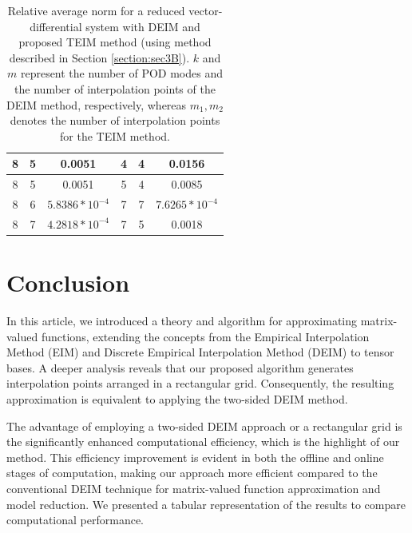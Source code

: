 \documentclass{article}
\begin{document}
\begin{table}
\begin{tabular}{|c|c|c|c|c|c|}
8 & 5          & 0.0051                                                                                       & 4           & 4           & 0.0156                                                                                        \\ \hline
8 & 5          & 0.0051                                                                                       & 5           & 4           & 0.0085                                                                                        \\ \hline
8 & 6          & $5.8386*10^{-4}$                                                                & 7           & 7           & $7.6265*10^{-4}$                                                                 \\ \hline
8 & 7          & $4.2818*10^{-4}$                                                                & 7           & 5           & 0.0018                                                                                        \\ \hline
\end{tabular}
\caption{Relative average norm for a reduced vector-differential system with DEIM and proposed TEIM method (using method described in Section \ref{section:sec3B}). $k$ and $m$ represent the number of POD modes and the number of interpolation points of the DEIM method, respectively, whereas $m_1,m_2$ denotes the number of interpolation points for the TEIM method.}
\label{tab:table5}
\end{table}



\section{Conclusion}
\label{section:sec5}
In this article, we introduced a theory and algorithm for approximating matrix-valued functions, extending the concepts from the Empirical Interpolation Method (EIM) and Discrete Empirical Interpolation Method (DEIM) to tensor bases. A deeper analysis reveals that our proposed algorithm generates interpolation points arranged in a rectangular grid. Consequently, the resulting approximation is equivalent to applying the two-sided DEIM method.

The advantage of employing a two-sided DEIM approach or a rectangular grid is the significantly enhanced computational efficiency, which is the highlight of our method. This efficiency improvement is evident in both the offline and online stages of computation, making our approach more efficient compared to the conventional DEIM technique for matrix-valued function approximation and model reduction. We presented a tabular representation of the results to compare computational performance.
\end{document}
